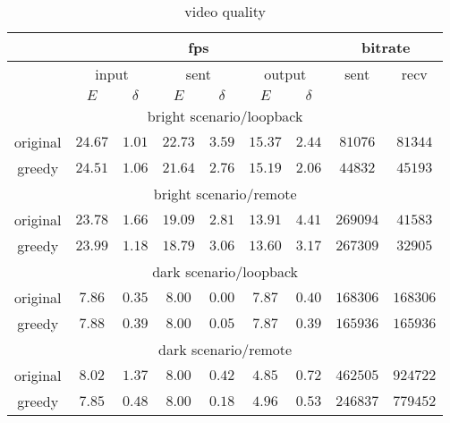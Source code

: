 \begin{table}[h]
  \centering
  \caption{video quality}
  \label{tab:quality}
  \begin{tabular}{|c|c|c|c|c|c|c|c|c|} %
    \hline
    & \multicolumn{6}{|c|}{fps} & \multicolumn{2}{|c|}{bitrate} \\ \hline
    & \multicolumn{2}{|c|}{input} & \multicolumn{2}{|c|}{sent}
    & \multicolumn{2}{|c|}{output} & sent & recv
    \\ \hline
    & $E$ & $\delta$ & $E$ & $\delta$ & $E$ & $\delta$ & & \\ \hline
    \multicolumn{9}{|c|}{bright scenario/loopback} \\ \hline
    original & $24.67$ & $1.01$ & $22.73$ & $3.59$ & $15.37$ & $2.44$ &
    $81076$ & $81344$ \\ \hline
    greedy & $24.51$ & $1.06$ & $21.64$ & $2.76$ & $15.19$ & $2.06$ &
    $44832$ & $45193$ \\ \hline
    \multicolumn{9}{|c|}{bright scenario/remote} \\ \hline
    original & $23.78$ & $1.66$ & $19.09$ & $2.81$ & $13.91$ & $4.41$ &
    $269094$ & $41583$ \\ \hline
    greedy & $23.99$ & $1.18$ & $18.79$ & $3.06$ & $13.60$ & $3.17$ &
    $267309$ & $32905$ \\ \hline
    \multicolumn{9}{|c|}{dark scenario/loopback} \\ \hline
    original & $7.86$ & $0.35$ & $8.00$ & $0.00$ & $7.87$ & $0.40$ &
    $168306$ & $168306$ \\ \hline
    greedy & $7.88$ & $0.39$ & $8.00$ & $0.05$ & $7.87$ & $0.39$ &
    $165936$ & $165936$ \\ \hline
    \multicolumn{9}{|c|}{dark scenario/remote} \\ \hline
    original & $8.02$ & $1.37$ & $8.00$ & $0.42$ & $4.85$ & $0.72$ &
    $462505$ & $924722$ \\ \hline
    greedy & $7.85$ & $0.48$ & $8.00$ & $0.18$ & $4.96$ & $0.53$ &
    $246837$ & $779452$ \\ \hline
  \end{tabular}
  
\end{table}

